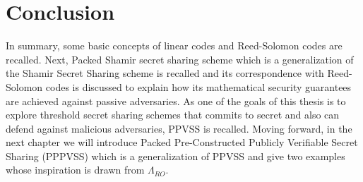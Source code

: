 \section{Conclusion}
In summary, some basic concepts of linear codes and Reed-Solomon codes are recalled. Next, Packed Shamir secret sharing scheme which is a generalization of the Shamir Secret Sharing scheme \cite{10.1145/359168.359176} 
is recalled and its correspondence with Reed-Solomon codes is discussed to explain how 
its mathematical security guarantees are achieved against passive adversaries. As one 
of the goals of this thesis is to explore threshold secret sharing schemes that commits to 
secret and also 
can defend against malicious adversaries, PPVSS \cite{cryptoeprint:2025/576} is recalled. 
Moving forward, in the next chapter we will introduce 
Packed Pre-Constructed Publicly Verifiable Secret Sharing (PPPVSS) which is a generalization of 
PPVSS and give two examples whose inspiration is drawn from $\Lambda_{RO}$.

